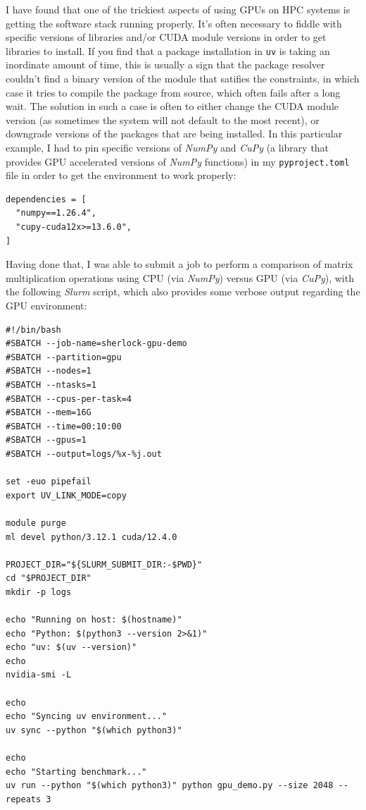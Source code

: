 I have found that one of the trickiest aspects of using GPUs on HPC systems is getting the software stack running properly.  It's often necessary to fiddle with specific versions of libraries and/or CUDA module versions in order to get libraries to install. If you find that a package installation in \texttt{uv} is taking an inordinate amount of time, this is usually a sign that the package resolver couldn't find a binary version of the module that satifies the constraints, in which case it tries to compile the package from source, which often fails after a long wait. The solution in such a case is often to either change the CUDA module version (as sometimes the system will not default to the most recent), or downgrade versions of the packages that are being installed.  In this particular example, I had to pin specific versions of \textit{NumPy} and \textit{CuPy} (a library that provides GPU accelerated versions of \textit{NumPy} functions) in my \texttt{pyproject.toml} file in order to get the environment to work properly:

\begin{lstlisting}[style=shell]
dependencies = [
  "numpy==1.26.4",
  "cupy-cuda12x>=13.6.0",
]
\end{lstlisting}

Having done that, I was able to submit a job to perform a comparison of matrix multiplication operations using CPU (via \textit{NumPy}) versus GPU (via \textit{CuPy}), with the following \textit{Slurm} script, which also provides some verbose output regarding the GPU environment:

\begin{lstlisting}[style=shell]
#!/bin/bash
#SBATCH --job-name=sherlock-gpu-demo
#SBATCH --partition=gpu
#SBATCH --nodes=1
#SBATCH --ntasks=1
#SBATCH --cpus-per-task=4
#SBATCH --mem=16G
#SBATCH --time=00:10:00
#SBATCH --gpus=1
#SBATCH --output=logs/%x-%j.out

set -euo pipefail
export UV_LINK_MODE=copy

module purge
ml devel python/3.12.1 cuda/12.4.0

PROJECT_DIR="${SLURM_SUBMIT_DIR:-$PWD}"
cd "$PROJECT_DIR"
mkdir -p logs

echo "Running on host: $(hostname)"
echo "Python: $(python3 --version 2>&1)"
echo "uv: $(uv --version)"
echo
nvidia-smi -L

echo
echo "Syncing uv environment..."
uv sync --python "$(which python3)"

echo
echo "Starting benchmark..."
uv run --python "$(which python3)" python gpu_demo.py --size 2048 --repeats 3
\end{lstlisting}

